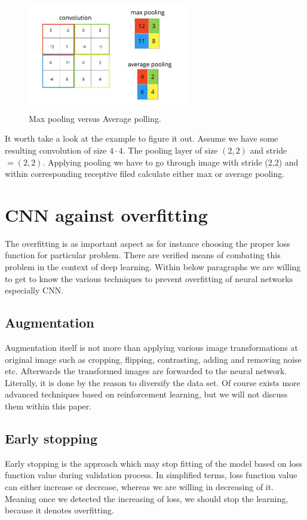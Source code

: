\begin{figure}[h]
    \centering \includegraphics[width=7cm]{images/pooling.jpg}
    \caption {Max pooling versus Average polling.}
\end{figure}

It worth take a look at the example to figure it out. Assume we have some resulting convolution of size $4 \cdot 4$. The pooling layer of size $(2, 2)$ and stride $ = (2, 2)$. 
Applying pooling we have to go through image with stride (2,2) and within corresponding receptive filed calculate either max or average pooling.  

\section{CNN against overfitting}
The overfitting is as important aspect as for instance choosing the proper loss function for particular problem. There are verified means of combating this problem in the context of deep learning. Within below paragraphs we are willing to get to know the various techniques to prevent overfitting of neural networks especially CNN. 

\subsection{Augmentation}
Augmentation itself is not more than applying various image transformations at original image such as cropping, flipping, contrasting, adding and removing noise etc. Afterwards the transformed images are forwarded to the neural network. Literally, it is done by the reason to diversify the data set. Of course exists more advanced techniques based on reinforcement learning, but we will not discuss them within this paper.      

\subsection{Early stopping}
Early stopping is the approach which may stop fitting of the model based on loss function value during validation process. In simplified terms, loss function value can either increase or decrease, whereas we are willing in decreasing of it. Meaning once we detected the increasing of loss, we should stop the learning, because it denotes overfitting.      

